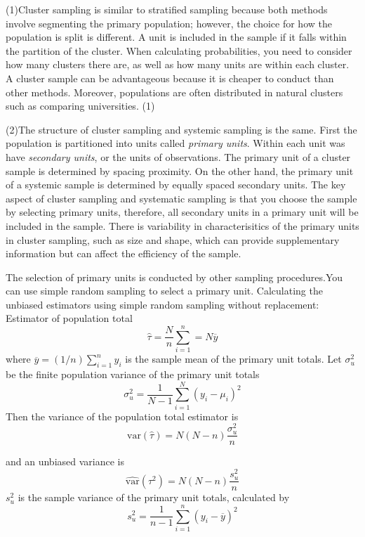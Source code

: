 \documentclass[12pt,twoside]{reedthesis}
\begin{document}
(1)Cluster sampling is similar to stratified sampling because both methods involve segmenting the primary population; however, the choice for how the population is split is different. A unit is included in the sample if it falls within the partition of the cluster. When calculating probabilities, you need to consider how many clusters there are, as well as how many units are within each cluster. A cluster sample can be advantageous because it is cheaper to conduct than other methods. Moreover, populations are often distributed in natural clusters such as comparing universities. (1)

(2)The structure of cluster sampling and systemic sampling is the same. First the population is partitioned into units called \emph{primary units}. Within each unit was have \emph{secondary units}, or the units of observations. The primary unit of a cluster sample is determined by spacing proximity. On the other hand, the primary unit of a systemic sample is determined by equally spaced secondary units. The key aspect of cluster sampling and systematic sampling is that you choose the sample by selecting primary units, therefore, all secondary units in a primary unit will be included in the sample. There is variability in characterisitics of the primary units in cluster sampling, such as size and shape, which can provide supplementary information but can affect the efficiency of the sample.

The selection of primary units is conducted by other sampling procedures.You can use simple random sampling to select a primary unit. Calculating the unbiased estimators using simple random sampling without replacement:
Estimator of population total
\[
\hat{\tau} = \frac{N}{n}\sum^n_{i=1} = N\overline{y}
\]
where \(\overline{y} = (1/n)\sum^n_{i=1}y_i\) is the sample mean of the primary unit totals. Let \(\sigma^2_u\) be the finite population variance of the primary unit totals
\[
\sigma^2_u = \frac{1}{N-1}\sum^N_{i=1}(y_i-\mu_i)^2
\]
Then the variance of the population total estimator is
\[
\text{var}\left(\hat{\tau}\right) = N\left(N-n\right)\frac{\sigma^2_u}{n}
\]

and an unbiased variance is
\[
\widehat{\text{var}}\left(\tau^2\right) = N\left(N-n\right)\frac{s^2_u}{n}
\]
\(s^2_u\) is the sample variance of the primary unit totals, calculated by
\[
s_u^2 = \frac{1}{n-1}\sum^n_{i=1}\left(y_i-\overline{y}\right)^2
\]
\end{document}
